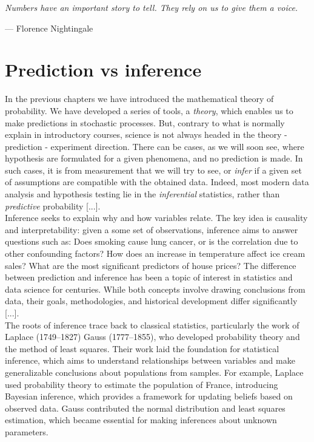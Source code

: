 \documentclass{book}
\begin{document}
\epigraph{\textit{Numbers have an important story to tell. They rely on us to give them a voice.}}{— Florence Nightingale}

\section{Prediction vs inference}

In the previous chapters we have introduced the mathematical theory of probability. We have developed a series of tools, a \textit{theory}, which enables us to make predictions in stochastic processes. But, contrary to what is normally explain in introductory courses, science is not always headed in the theory - prediction - experiment direction. There can be cases, as we will soon see, where hypothesis are formulated for a given phenomena, and no prediction is made. In such cases, it is from measurement that we will try to see, or \textit{infer} if a given set of assumptions are compatible with the obtained data. Indeed, most modern data analysis and hypothesis testing lie in the \textit{inferential} statistics, rather than \textit{predictive} probability [...].\\

Inference seeks to explain why and how variables relate. The key idea is causality and interpretability: given a some set of observations, inference aims to answer questions such as: Does smoking cause lung cancer, or is the correlation due to other confounding factors? How does an increase in temperature affect ice cream sales? What are the most significant predictors of house prices? The difference between prediction and inference has been a topic of interest in statistics and data science for centuries. While both concepts involve drawing conclusions from data, their goals, methodologies, and historical development differ significantly [...].\\

The roots of inference trace back to classical statistics, particularly the work of Laplace (1749–1827) Gauss (1777–1855), who developed probability theory and the method of least squares. Their work laid the foundation for statistical inference, which aims to understand relationships between variables and make generalizable conclusions about populations from samples. For example, Laplace used probability theory to estimate the population of France, introducing Bayesian inference, which provides a framework for updating beliefs based on observed data. Gauss contributed the normal distribution and least squares estimation, which became essential for making inferences about unknown parameters.
\end{document}
